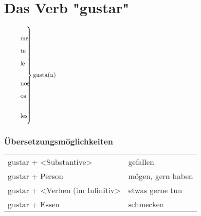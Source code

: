 \documentclass{../spanish_summary}
\begin{document}
\chapter*{Das Verb "gustar"}
$
\left.\parbox{0.1\textwidth}{%
\begin{itemize}
  \item[] me
  \item[] te   
  \item[] le   
  \item[] nos   
  \item[] os  
  \item[] les   
\end{itemize}
}\right\} \vbox{\noindent gusta(n)}
$

\subsection*{Übersetzungsmöglichkeiten}
\begin{longtable}{p{}p{}} 
gustar + <Substantive> & gefallen\\
gustar + Person & mögen, gern haben\\
gustar + <Verben (im Infinitiv> & etwas gerne tun\\
gustar + Essen & schmecken
\end{longtable}
\end{document}
